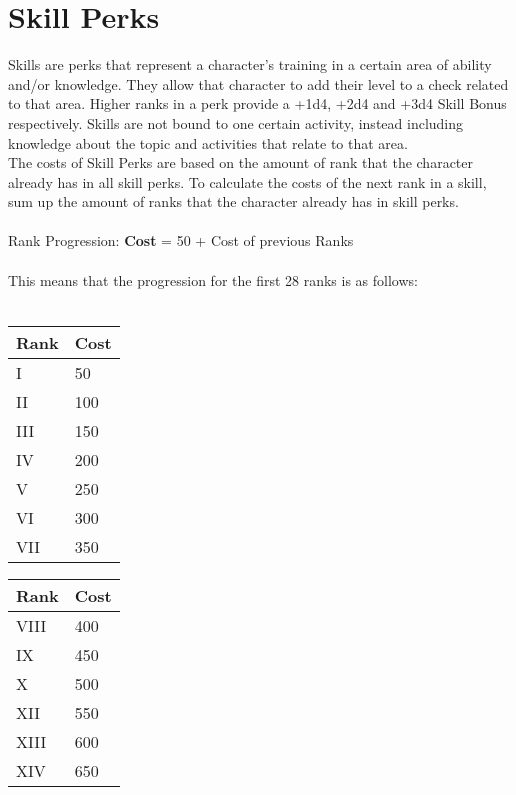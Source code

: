 \chapter{Skill Perks}\label{ch:skillPerks}
Skills are perks that represent a character's training in a certain area of ability and/or knowledge.
They allow that character to add their level to a check related to that area.
Higher ranks in a perk provide a +1d4, +2d4 and +3d4 Skill Bonus respectively.
Skills are not bound to one certain activity, instead including knowledge about the topic and activities that relate to that area.\\
The costs of Skill Perks are based on the amount of rank that the character already has in all skill perks.
To calculate the costs of the next rank in a skill, sum up the amount of ranks that the character already has in skill perks.\\
\\
Rank Progression: \textbf{Cost} = 50 + Cost of previous Ranks\\
\\
This means that the progression for the first 28 ranks is as follows:\\
\\
\begin{minipage}{0.25\textwidth}
    \begin{tabular}{l | l}
        Rank & Cost\\ \hline
        I & 50\\
        II & 100\\
        III & 150\\
        IV & 200\\
        V & 250\\
        VI & 300\\
        VII & 350\\
    \end{tabular}
\end{minipage}
\begin{minipage}{0.25\textwidth}
    \begin{tabular}{l | l}
        Rank & Cost\\ \hline
        VIII & 400\\
        IX & 450\\
        X & 500\\
        XII & 550\\
        XIII & 600\\
        XIV & 650\\
    \end{tabular}
\end{minipage}
